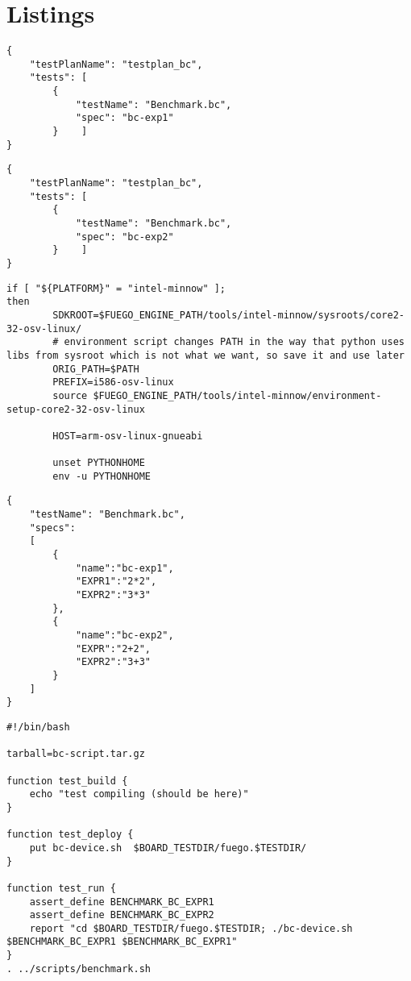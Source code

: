 \section{Listings}
\label{sec:listings}

\begin{lstlisting}[label=testplan-bc-exp1,caption=\texttt{testplan\_bc\_exp1.json} file]
{
    "testPlanName": "testplan_bc",
    "tests": [
        {
            "testName": "Benchmark.bc",
            "spec": "bc-exp1"
        }    ]
}
\end{lstlisting}

\begin{lstlisting}[label=testplan-bc-exp2,caption=\texttt{testplan\_bc\_exp2.json} file]
{
    "testPlanName": "testplan_bc",
    "tests": [
        {
            "testName": "Benchmark.bc",
            "spec": "bc-exp2"
        }    ]
}
\end{lstlisting}


\begin{lstlisting}[label=intel-minnow-tools,caption=\texttt{intel minnow tools} section]
if [ "${PLATFORM}" = "intel-minnow" ];
then
        SDKROOT=$FUEGO_ENGINE_PATH/tools/intel-minnow/sysroots/core2-32-osv-linux/
        # environment script changes PATH in the way that python uses libs from sysroot which is not what we want, so save it and use later
        ORIG_PATH=$PATH
        PREFIX=i586-osv-linux
        source $FUEGO_ENGINE_PATH/tools/intel-minnow/environment-setup-core2-32-osv-linux

        HOST=arm-osv-linux-gnueabi
        
        unset PYTHONHOME
        env -u PYTHONHOME
\end{lstlisting}

\begin{lstlisting}[label=spec-bc,caption=\texttt{Benchmark.bc.spec} file]
  {
    "testName": "Benchmark.bc",
    "specs": 
    [
        {
            "name":"bc-exp1",
            "EXPR1":"2*2",
            "EXPR2":"3*3"
        },
        {
            "name":"bc-exp2",
            "EXPR":"2+2",
            "EXPR2":"3+3"
        }
    ]
}
\end{lstlisting}

\begin{lstlisting}[label=bc-script,caption=\texttt{bc-script.sh} file]
#!/bin/bash

tarball=bc-script.tar.gz

function test_build {
    echo "test compiling (should be here)"
}

function test_deploy {
	put bc-device.sh  $BOARD_TESTDIR/fuego.$TESTDIR/
}

function test_run {
    assert_define BENCHMARK_BC_EXPR1
    assert_define BENCHMARK_BC_EXPR2
    report "cd $BOARD_TESTDIR/fuego.$TESTDIR; ./bc-device.sh $BENCHMARK_BC_EXPR1 $BENCHMARK_BC_EXPR1"  
}
. ../scripts/benchmark.sh
\end{lstlisting}


